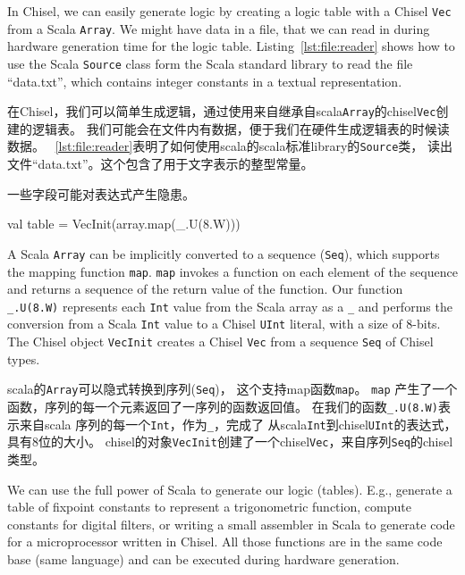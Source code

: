 \documentclass[%
    10pt,
    headinclude, footexclude,
    openright, %
    notitlepage,
    cleardoubleempty,
    headsepline,
    pointlessnumbers,
    bibtotoc, idxtotoc,
    ]{scrbook}
\newcommand{\code}[1]{{\small{\texttt{#1}}}}
\begin{document}
{In Chisel, we can easily generate logic by creating a logic table with
a Chisel \code{Vec} from a Scala \code{Array}.
We might have data in a file, that we can read in during hardware generation
time for the logic table.
Listing~\ref{lst:file:reader} shows how to use the Scala \code{Source}
class form the Scala standard library to read the file ``data.txt'', which
contains integer constants in a textual representation.

在Chisel，我们可以简单生成逻辑，通过使用来自继承自scala\code{Array}的chisel\code{Vec}创建的逻辑表。
我们可能会在文件内有数据，便于我们在硬件生成逻辑表的时候读数据。
~\ref{lst:file:reader}表明了如何使用scala的scala标准library的\code{Source}类，
读出文件``data.txt''。这个包含了用于文字表示的整型常量。

一些字段可能对表达式产生隐患。

\begin{chisel}
  val table = VecInit(array.map(_.U(8.W)))
\end{chisel}

\noindent A Scala \code{Array} can be implicitly converted to a sequence (\code{Seq}),
which supports the mapping function \code{map}.
\code{map} invokes a function on each element of the sequence and returns
a sequence of the return value of the function. Our function \code{\_.U(8.W)} represents
each \code{Int} value from the Scala array as a \code{\_} and performs the conversion
from a Scala \code{Int} value to a Chisel \code{UInt} literal, with a size of 8-bits.
The Chisel object \code{VecInit} creates a Chisel \code{Vec} from a sequence \code{Seq}
of Chisel types.

\noindent scala的\code{Array}可以隐式转换到序列(\code{Seq})，
这个支持map函数\code{map}。
\code{map} 产生了一个函数，序列的每一个元素返回了一序列的函数返回值。
在我们的函数\code{\_.U(8.W)}表示来自scala 序列的每一个\code{Int}，作为\code{\_}，完成了
从scala\code{Int}到chisel\code{UInt}的表达式，具有8位的大小。
chisel的对象\code{VecInit}创建了一个chisel\code{Vec}，来自序列\code{Seq}的chisel类型。



We can use the full power of Scala to generate our logic (tables).
E.g., generate a table of fixpoint constants to represent a trigonometric function,
compute constants for digital filters, or writing a small assembler in Scala
to generate code for a microprocessor written in Chisel. All those functions
are in the same code base (same language) and can be executed during
hardware generation.

}
\end{document}
